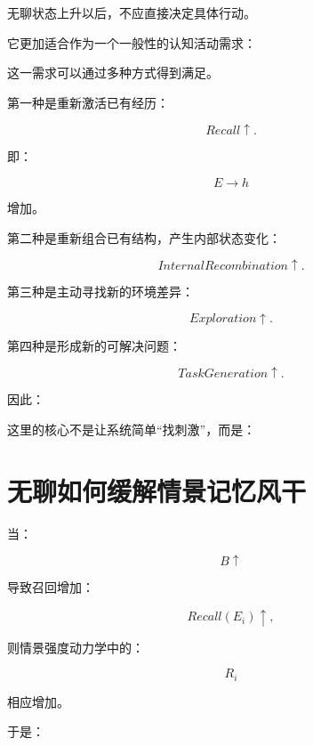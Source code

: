 无聊状态上升以后，不应直接决定具体行动。

它更加适合作为一个一般性的认知活动需求：

\begin{statementbox}
\centering
{}
\end{statementbox}

这一需求可以通过多种方式得到满足。

第一种是重新激活已有经历：

\[
Recall\uparrow.
\]

即：

\[
E\rightarrow h
\]

增加。

第二种是重新组合已有结构，产生内部状态变化：

\[
InternalRecombination\uparrow.
\]

第三种是主动寻找新的环境差异：

\[
Exploration\uparrow.
\]

第四种是形成新的可解决问题：

\[
TaskGeneration\uparrow.
\]

因此：

\begin{statementbox}
\centering
{}
\end{statementbox}

这里的核心不是让系统简单“找刺激”，而是：

\begin{statementbox}
\centering
{}
\end{statementbox}

\section{无聊如何缓解情景记忆风干}

当：

\[
B\uparrow
\]

导致召回增加：

\[
Recall(E_i)\uparrow,
\]

则情景强度动力学中的：

\[
R_i
\]

相应增加。

于是：

